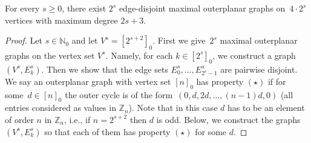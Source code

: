 \documentclass[unicode,runningheads,envcountsame,a4paper,dvipsnames,12pt]{llncs}
\newcommand{\N}{\mathbb{N}}
\newcommand{\Z}{\mathbb{Z}}
\begin{document}
	\begin{lemma}
		\label{lem:optimal-ot-power-2-construct}
		For every $s \geq 0$, there exist \(2^s\) edge-disjoint maximal outerplanar graphs on~$4 \cdot 2^s$ vertices with maximum degree \(2s+3\).
	\end{lemma}
	\begin{proof}
		Let \(s \in \N_0\) and let \(V^s=[2^{s+2}]_0\). First we give~\(2^s\) maximal outerplanar graphs on the vertex set \(V^s\). Namely, for each \(k \in [2 ^s]_0\), we construct a graph~\((V^s,E^s_k)\). Then we show that the edge sets \(E^s_0, \dots, E^{s}_{2^s-1}\) are pairwise disjoint.		
		We say an outerplanar graph with vertex set \([n]_0\) has property \((\star)\) if for some~\(d \in [n]_0\) the outer cycle is of the form~\((0,d,2d,\dots,(n-1)d,0)\) (all entries considered as values in \(\Z_n\)). Note that in this case \(d\) has to be an element of order \(n\) in \(\Z_n\), i.e., if \(n=2^{s+2}\) then \(d\) is odd.
		Below, we construct the graphs $(V^s,E^s_k)$ so that each of them has property \((\star)\) for some $d$.
		

\end{proof}
\end{document}
